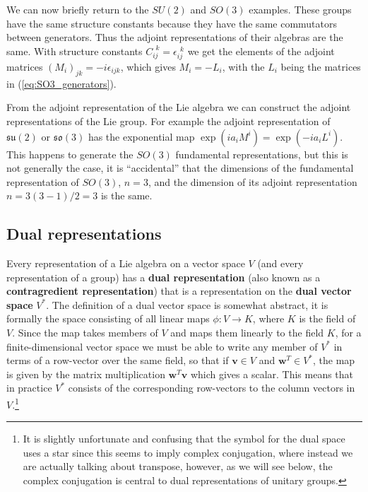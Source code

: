 \documentclass[notes.tex]{subfiles}
\begin{document}
We can now briefly return to the $SU(2)$ and $SO(3)$ examples. These groups have the same structure constants because they have the same commutators between generators. Thus the adjoint representations of their algebras are the same. With structure constants $C^{~~k}_{ij}=\epsilon_{ij}^{~~k}$ we get the elements of the adjoint matrices $(M_i)_{jk} =-i\epsilon_{ijk}$, which gives $M_i=-L_i$, with the $L_i$ being the matrices in (\ref{eq:SO3_generators}). 

From the adjoint representation of the Lie algebra we can construct  the adjoint representations of the Lie group. For example the adjoint representation of  $\mathfrak{su}(2)$ or $\mathfrak{so}(3)$ has the exponential map $\exp{(ia_i M^i)}=\exp{(-ia_i L^i)}$. This happens to generate the $SO(3)$ fundamental representations, but this is not generally the case, it is ``accidental'' that the dimensions of the fundamental representation of $SO(3)$, $n=3$, and the dimension of its adjoint representation $n=3(3-1)/2=3$ is the same.


\subsection{Dual representations}
\label{sec:dual_reps}

Every representation of a Lie algebra on a vector space $V$ (and every representation of a group) has a {\bf dual representation} (also known as a {\bf contragredient representation}) that is a representation on the {\bf dual vector space} $V^*$. The definition of a dual vector space is somewhat abstract, it is formally the space consisting of all linear maps $\phi:V\to K$, where $K$ is the field of $V$. Since the map takes members of $V$ and maps them linearly to the field $K$, for a finite-dimensional vector space we must be able to write any member of $V^*$ in terms of a row-vector over the same field, so that if $\mathbf v\in V$ and $\mathbf w^T \in V^*$, the map is given by the matrix multiplication $\mathbf w^T \mathbf v$ which gives a scalar. This means that in practice  $V^*$ consists of the corresponding row-vectors to the column vectors in $V$.\footnote{It is slightly unfortunate and confusing that the symbol for the dual space uses a star since this seems to imply complex conjugation, where instead we are actually talking about transpose, however, as we will see below, the complex conjugation is central to dual representations of unitary groups.}
\end{document}
